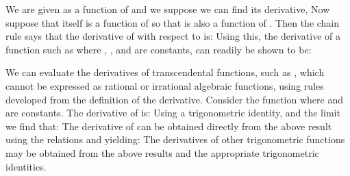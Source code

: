 {{We are given  as a function of  and we suppose we can find its derivative,
%
%
Now suppose that  itself is a function of  so that  is also a function of .
Then the chain rule says that the derivative of  with respect to  is:
%
%
Using this, the derivative of a function such as
%
%
where , , and  are constants, can readily be shown to be: 
%
}
%
%
%
\par{We can evaluate the derivatives of transcendental functions, such as
, which cannot be expressed as rational or irrational algebraic
functions, using rules developed from the definition of the derivative.
Consider the function  where  and \m{\delta}
are constants.
The derivative of  is:
%
%
Using a trigonometric identity,
%
%
%
and the limit
%
%
we find that: 
%
The derivative of  can be obtained directly from the
above result using the relations
%
%
and
%
%
yielding:
%
The derivatives of other trigonometric functions may be obtained from the
above results and the appropriate trigonometric identities.
}}
